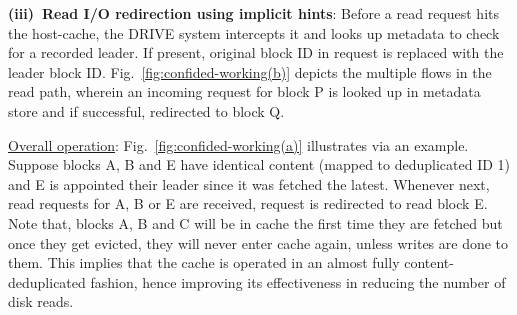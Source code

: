 \textbf{(iii)~Read I/O redirection using implicit hints}: 
Before a read request hits the host-cache, the DRIVE
system intercepts it and looks up metadata to check for a recorded leader. If present, original
block ID in request is replaced with the leader block ID. Fig.~\ref{fig:confided-working(b)} 
depicts the multiple flows in
the read path, wherein an incoming request for block P is looked up in metadata store and if
successful, redirected to block Q.

\underline{Overall operation}: Fig.~\ref{fig:confided-working(a)} 
illustrates via an example. Suppose blocks A, B and E have identical
content (mapped to deduplicated ID 1) and E is appointed their leader since it was fetched the
latest. Whenever next, read requests for A, B or E are received, request is redirected to read
block E. Note that, blocks A, B and C will be in cache the first time they are fetched but once
they get evicted, they will never enter cache again, unless writes are done to them. This implies
that the cache is operated in an almost fully content-deduplicated fashion, hence improving its
effectiveness in reducing the number of disk reads.



